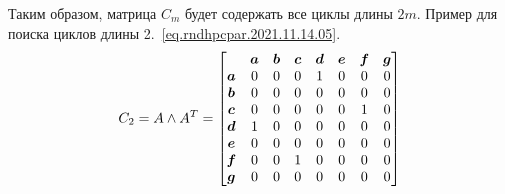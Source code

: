 Таким образом, матрица $C_m$ будет содержать все циклы длины $2m$. Пример для поиска циклов длины 2.~\ref{eq.rndhpcpar.2021.11.14.05}.
\begin{equation}\label{eq.rndhpcpar.2021.11.14.05}
	C_2 = A \wedge A^T = %
	\begin{bmatrix}
		&	\bs{a}	&	\bs{b}	&	\bs{c}	&	\bs{d}	&	\bs{e}	&	\bs{f}	&	\bs{g} \\
	\bs{a}	&	0	&	0	&	0	& 	1	& 	0	& 	0	 & 	0 \\
	\bs{b}	&	0	&	0	&	0	& 	0	& 	0	& 	0	 & 	0 \\
	\bs{c}	&	0	&	0	&	0	& 	0	& 	0	& 	1	 & 	0 \\
	\bs{d}	&	1	&	0	&	0	& 	0	& 	0	& 	0	 & 	0 \\
	\bs{e}	&	0	&	0	&	0	& 	0	& 	0	& 	0	 & 	0 \\
	\bs{f}	&	0	&	0	&	1	& 	0	& 	0	& 	0	 & 	0 \\
	\bs{g}	&	0	&	0	&	0	& 	0	& 	0	& 	0	 & 	0 \\
	\end{bmatrix}
	\end{equation}

\noteattributes{}
